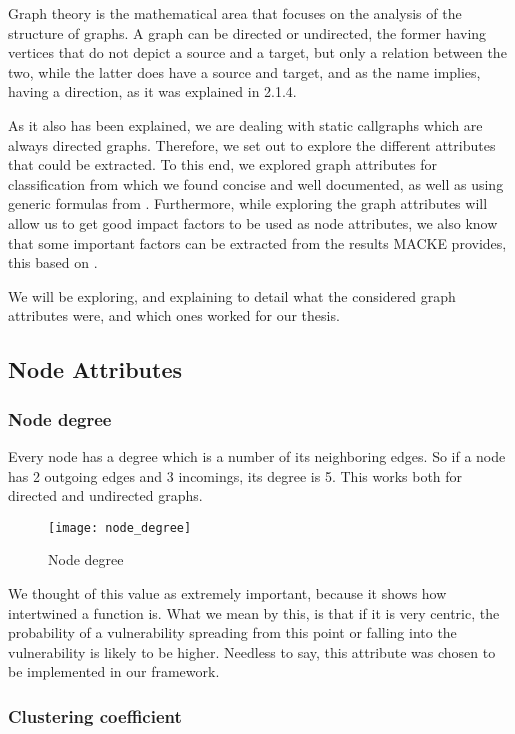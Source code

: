Graph theory \parencite{graphs} is the mathematical area that focuses on the analysis of the structure of graphs. A graph can be directed or undirected, the former having vertices that do not depict a source and a target, but only a relation between the two, while the latter does have a source and target, and as the name implies, having a direction, as it was explained in 2.1.4.

As it also has been explained, we are dealing with static callgraphs which are always directed graphs. Therefore, we set out to explore the different attributes that could be extracted. To this end, we explored graph attributes for classification from \parencite{graphClassification} which we found concise and well documented, as well as using generic formulas from \parencite{graphs}. Furthermore, while exploring the graph attributes will allow us to get good impact factors to be used as node attributes, we also know that some important factors can be extracted from the results MACKE provides, this based on \parencite{ognawala}.

We will be exploring, and explaining to detail what the considered graph attributes were, and which ones worked for our thesis.

\subsection{Node Attributes}

\subsubsection{Node degree}

Every node has a degree which is a number of its neighboring edges. So if a node has 2 outgoing edges and 3 incomings, its degree is 5. This works both for directed and undirected graphs.

\begin{figure}[!htb]
	\caption{Node degree}
	\centering
	\texttt{[image: node\_degree]}
\end{figure}

We thought of this value as extremely important, because it shows how intertwined a function is. What we mean by this, is that if it is very centric, the probability of a vulnerability spreading from this point or falling into the vulnerability is likely to be higher. Needless to say, this attribute was chosen to be implemented in our framework.

\subsubsection{Clustering coefficient}

